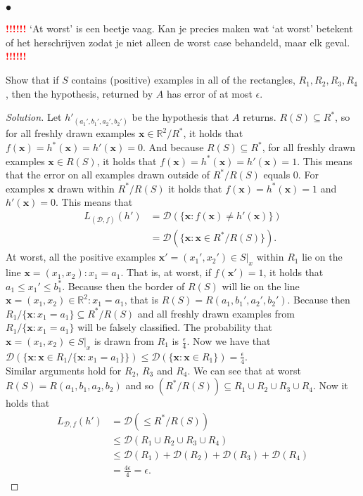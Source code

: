 \documentclass[10pt, a4paper, twoside]{amsart}
\newcommand{\R}{\ensuremath{\mathbb{R}}}
\newenvironment{solution}
               {\let\oldqedsymbol=\qedsymbol
                \renewcommand{\qedsymbol}{$\blacktriangleleft$}
                \begin{proof}[Solution]}
               {\end{proof}
                \renewcommand{\qedsymbol}{\oldqedsymbol}}
\newcommand{\TODO}{\textcolor{red}{\textbf{!!!!!! }}}
\begin{document}
\subsubsection*{$\bullet$}
\TODO `At worst' is een beetje vaag. Kan je precies maken wat `at worst' betekent of 
het herschrijven zodat je niet alleen de worst case behandeld, maar elk geval. \TODO


Show that if $S$ contains (positive) examples in all of the rectangles, $R_1, R_2, R_3, R_4$, then the hypothesis, returned by $A$ has error of at most $\epsilon$. 

\begin{solution}
  Let $h'_{(a_1',b_1',a_2',b_2')}$ be the hypothesis that $A$ returns. $R(S)\subseteq R^*$, so for all freshly drawn examples $\mathbf{x} \in \R^2/R^*$,  it holds that $f(\mathbf{x})=h^*(\mathbf{x}) = h'(\mathbf{x}) = 0$. And because $R(S)\subseteq R^*$, for all freshly drawn examples $\mathbf{x} \in R(S)$, it holds that $f(\mathbf{x})=h^*(\mathbf{x}) = h'(\mathbf{x}) = 1$. This means that the error on all examples drawn outside of $R^*/R(S)$ equals $0$. For examples $\mathbf{x}$ drawn within $R^*/R(S)$ it holds that $f(\mathbf{x})=h^*(\mathbf{x}) = 1$ and $h'(\mathbf{x}) = 0$. This means that
  \begin{align*}
  L_{(\mathcal{D},f)}(h') &= \mathcal{D}(\{\mathbf{x}: f(\mathbf{x}) \neq h'(\mathbf{x})\}) \\
  &= \mathcal{D}(\{\mathbf{x}:\mathbf{x}\in R^*/R(S)\}). 
  \end{align*}
  At worst, all the positive examples $\mathbf{x'} = (x_1',x_2') \in S|_x$ within $R_1$ lie on the line $\mathbf{x}=(x_1,x_2):x_1 = a_1$. That is, at worst, if $f(\mathbf{x'}) = 1$, it holds that $a_1\leq x_1' \leq b_1^*$. Because then the border of $R(S)$ will lie on the line $\mathbf{x} = (x_1,x_2) \in \R^2: x_1 = a_1$, that is $R(S) = R(a_1,b_1',a_2',b_2')$. Because then $R_{1}/\{\mathbf{x}:x_1=a_1\} \subseteq R^*/R(S)$ and all freshly drawn examples from $R_{1}/\{\mathbf{x}:x_1=a_1\}$ will be falsely classified. The probability that $\mathbf{x} = (x_1,x_2) \in S|_x$ is drawn from $R_1$ is $\frac{\epsilon}{4}$. Now we have that $\mathcal{D}(\{\mathbf{x}: \mathbf{x} \in R_{1}/\{\mathbf{x}:x_1=a_1\}\}) \leq \mathcal{D}(\{\mathbf{x}: \mathbf{x} \in R_{1}\}) = \frac{\epsilon}{4}$.\\
  Similar arguments hold for $R_2$, $R_3$ and $R_4$. We can see that at worst $R(S) = R(a_1,b_1,a_2,b_2)$ and so $(R^*/R(S)) \subseteq R_1 \cup R_2 \cup R_3 \cup R_4$. Now it holds that
\begin{align*}
  L_{\mathcal{D},f}(h') & = \mathcal{D}(\leq R^*/R(S)) \\
                      & \leq \mathcal{D}(R_1 \cup R_2 \cup R_3 \cup R_4) \\
                      & \leq \mathcal{D}(R_1) + \mathcal{D}(R_2) + \mathcal{D}(R_3) + \mathcal{D}(R_4)\\
 & = \frac{4\epsilon}{4} = \epsilon.
\end{align*}  
\end{solution}
\end{document}
